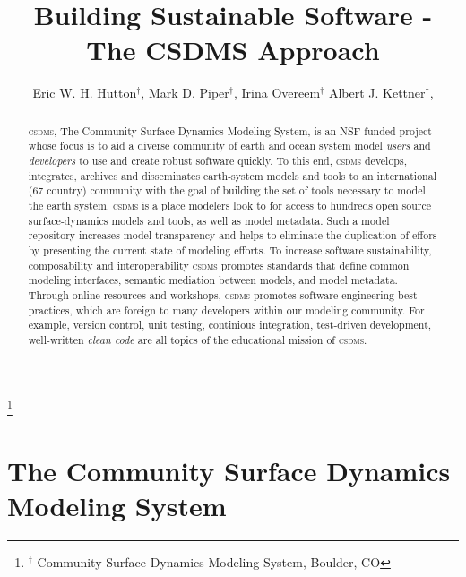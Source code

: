 \documentclass[11pt, oneside]{amsart}
\DeclareRobustCommand{\csdms}{\textsc{csdms}}
\begin{document}
\title[]{Building Sustainable Software - The CSDMS Approach}

\author{
  Eric W. H. Hutton$^{\dag}$,
  Mark D. Piper$^{\dag}$,
  Irina Overeem$^{\dag}$
  Albert J. Kettner$^{\dag}$,
}

\thanks{{}$^{\dag}$ Community Surface Dynamics Modeling System, Boulder, CO}

\begin{abstract}

\csdms, The Community Surface Dynamics Modeling System, is an NSF funded
project whose focus is to aid a diverse community of earth and ocean system
model \emph{users} and \emph{developers} to use and create robust software
quickly.  To this end, \csdms{} develops, integrates, archives and disseminates
earth-system models and tools to an international (67 country) community
with the goal of building the set of tools necessary to model the
earth system. \csdms{} is a place modelers look to for access to hundreds open
source surface-dynamics models and tools, as well as model metadata. Such a
model repository increases model transparency and helps to eliminate the
duplication of effors by presenting the current state of modeling efforts.
To increase software sustainability, composability and interoperability \csdms{}
promotes standards that define common modeling interfaces, semantic mediation
between models, and model metadata. Through online resources and workshops,
\csdms{} promotes software engineering best practices, which are foreign to many
developers within our modeling community. For example, version control, unit
testing, continious integration, test-driven development, well-written
\emph{clean code} are all topics of the educational mission of \csdms{}.

\end{abstract}

\maketitle

\section{The Community Surface Dynamics Modeling System}
\end{document}
